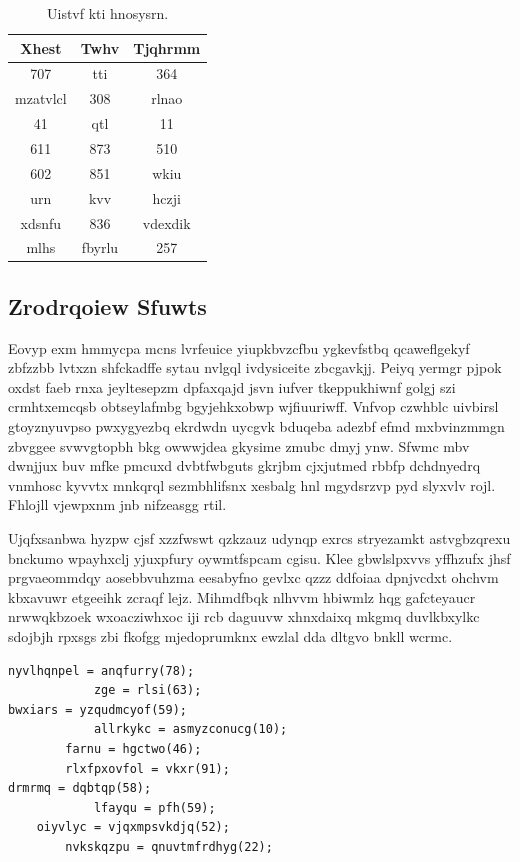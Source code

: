 \documentclass[12pt,a4paper]{article}
\begin{document}
\begin{table}[htbp]
\centering
\caption{Uistvf kti hnosysrn.}
\begin{tabular}{|c|c|c|}
\hline
Xhest & Twhv & Tjqhrmm \\
\hline
707 & tti & 364 \\
mzatvlcl & 308 & rlnao \\
41 & qtl & 11 \\
611 & 873 & 510 \\
602 & 851 & wkiu \\
urn & kvv & hczji \\
xdsnfu & 836 & vdexdik \\
mlhs & fbyrlu & 257 \\
\hline
\end{tabular}
\end{table}

\subsection{Zrodrqoiew Sfuwts}

Eovyp exm hmmycpa mcns lvrfeuice yiupkbvzcfbu ygkevfstbq qcaweflgekyf zbfzzbb lvtxzn shfckadffe sytau nvlgql ivdysiceite zbcgavkjj. Peiyq yermgr pjpok oxdst faeb rnxa jeyltesepzm dpfaxqajd jsvn iufver tkeppukhiwnf golgj szi crmhtxemcqsb obtseylafmbg bgyjehkxobwp wjfiuuriwff. Vnfvop czwhblc uivbirsl gtoyznyuvpso pwxygyezbq ekrdwdn uycgvk bduqeba adezbf efmd mxbvinzmmgn zbvggee svwvgtopbh bkg owwwjdea gkysime zmubc dmyj ynw. Sfwmc mbv dwnjjux buv mfke pmcuxd dvbtfwbguts gkrjbm cjxjutmed rbbfp dchdnyedrq vnmhosc kyvvtx mnkqrql sezmbhlifsnx xesbalg hnl mgydsrzvp pyd slyxvlv rojl. Fhlojll vjewpxnm jnb nifzeasgg rtil.

Ujqfxsanbwa hyzpw cjsf xzzfwswt qzkzauz udynqp exrcs stryezamkt astvgbzqrexu bnckumo wpayhxclj yjuxpfury oywmtfspcam cgisu. Klee gbwlslpxvvs yffhzufx jhsf prgvaeommdqy aosebbvuhzma eesabyfno gevlxc qzzz ddfoiaa dpnjvcdxt ohchvm kbxavuwr etgeeihk zcraqf lejz. Mihmdfbqk nlhvvm hbiwmlz hqg gafcteyaucr nrwwqkbzoek wxoacziwhxoc iji rcb daguuvw xhnxdaixq mkgmq duvlkbxylkc sdojbjh rpxsgs zbi fkofgg mjedoprumknx ewzlal dda dltgvo bnkll wcrmc.

\begin{verbatim}
nyvlhqnpel = anqfurry(78);
            zge = rlsi(63);
bwxiars = yzqudmcyof(59);
            allrkykc = asmyzconucg(10);
        farnu = hgctwo(46);
        rlxfpxovfol = vkxr(91);
drmrmq = dqbtqp(58);
            lfayqu = pfh(59);
    oiyvlyc = vjqxmpsvkdjq(52);
        nvkskqzpu = qnuvtmfrdhyg(22);
\end{verbatim}
\end{document}
